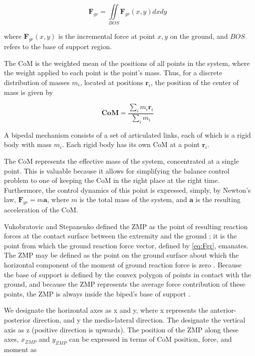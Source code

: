 \documentclass{llncs}
\begin{document}
\begin{equation}
\mathbf{F}_{gr} = \iint\limits_{BOS} \mathbf{F}_{gr} \left( x, y \right) dx dy
\label{eq:Fgr}
\end{equation}

\noindent where $\mathbf{F}_{gr} \left( x, y \right)$ is the incremental force at point $x,y$ on the ground, and $BOS$ refers to the base of support region.

The CoM is the weighted mean of the positions of all points in the system, where the weight applied to each point is the point’s mass.  Thus, for a discrete distribution of masses $m_i$, located at positions $\mathbf{r}_i$, the position of the center of mass is given by

\begin{equation}
\mathbf{CoM} = \frac{\sum_i m_i \mathbf{r}_i}{\sum_i m_i}
\label{eq:CoM}
\end{equation}

\noindent A bipedal mechanism consists of a set of articulated links, each of which is a rigid body with mass $m_i$.
Each rigid body has its own CoM at a point $\mathbf{r}_i$.

The CoM represents the effective mass of the system, concentrated at a single point.  
This is valuable because it allows for simplifying the balance control problem to one of keeping the CoM in the right place at the right time.  
Furthermore, the control dynamics of this point is expressed, simply, by Newton’s law, $\mathbf{F}_{gr} = m \mathbf{a}$, where $m$ is the total
mass of the system, and $\mathbf{a}$ is the resulting acceleration of the CoM.

Vukobratovic and Stepanenko defined the ZMP as the point of resulting reaction forces at the contact surface between the extremity and the ground \cite{vukobratovic1972stability};  
it is the point from which the ground reaction force vector, defined by \ref{eq:Fgr}, emanates.  
The ZMP may be defined as the point on the ground surface about which the horizontal component of the moment of ground reaction force is zero 
\cite{arakawa1997natural, vukobratovic2004zero}.
Because the base of support is defined by the convex polygon of points in contact with the ground, and because the ZMP represents the average force contribution 
of these points, the ZMP is always inside the biped’s base of support \cite{Gos99b}. 

We designate the horizontal axes as x and y, where x represents the anterior-posterior direction, and y the medio-lateral direction.
The designate the vertical axis as z (positive direction is upwards).
The position of the ZMP along these axes, $x_{ZMP}$ and $y_{ZMP}$ can be expressed in terms of CoM position, force, and moment as
\end{document}
